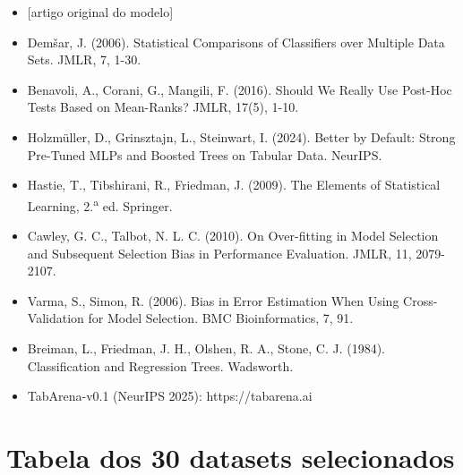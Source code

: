 \documentclass[11pt,a4paper]{article}
\begin{document}
\begin{itemize}[leftmargin=1.2em]
\item {[artigo original do modelo]}
\item Demšar, J. (2006). Statistical Comparisons of Classifiers over Multiple Data Sets. JMLR, 7, 1-30.
\item Benavoli, A., Corani, G., Mangili, F. (2016). Should We Really Use Post-Hoc Tests Based on Mean-Ranks? JMLR, 17(5), 1-10.
\item Holzmüller, D., Grinsztajn, L., Steinwart, I. (2024). Better by Default: Strong Pre-Tuned MLPs and Boosted Trees on Tabular Data. NeurIPS.
\item Hastie, T., Tibshirani, R., Friedman, J. (2009). The Elements of Statistical Learning, 2.\textsuperscript{a} ed. Springer.
\item Cawley, G. C., Talbot, N. L. C. (2010). On Over-fitting in Model Selection and Subsequent Selection Bias in Performance Evaluation. JMLR, 11, 2079-2107.
\item Varma, S., Simon, R. (2006). Bias in Error Estimation When Using Cross-Validation for Model Selection. BMC Bioinformatics, 7, 91.
\item Breiman, L., Friedman, J. H., Olshen, R. A., Stone, C. J. (1984). Classification and Regression Trees. Wadsworth.
\item TabArena-v0.1 (NeurIPS 2025): https://tabarena.ai
\end{itemize}

\appendix

\section{Tabela dos 30 datasets selecionados}
\label{ap:datasets}

\end{document}

